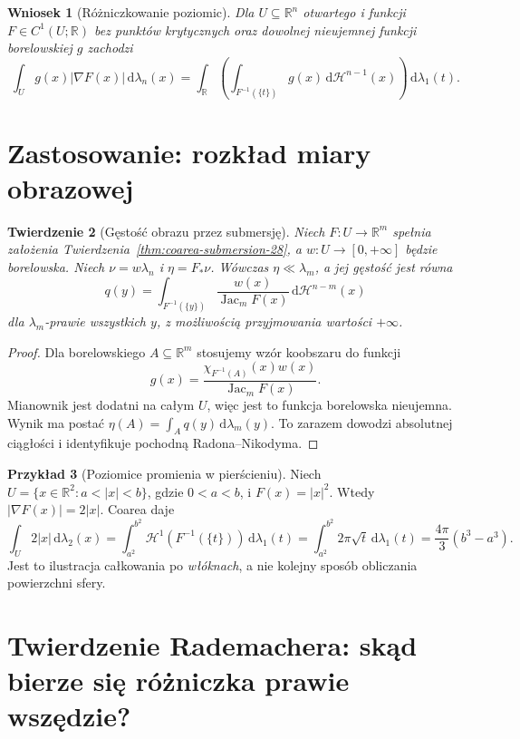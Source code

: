 \documentclass[11pt,a4paper,oneside]{book}
\numberwithin{equation}{chapter}
\theoremstyle{plain}
\newtheorem{twierdzenie}{Twierdzenie}[chapter]
\newtheorem{wniosek}[twierdzenie]{Wniosek}
\theoremstyle{definition}
\newtheorem{przyklad}[twierdzenie]{Przykład}
\theoremstyle{remark}
\begin{document}
\begin{wniosek}[Różniczkowanie poziomic]
\label{cor:coarea-level-28}
Dla $U\subseteq\mathbb R^n$ otwartego i
funkcji $F\in C^1(U;\mathbb R)$
bez punktów krytycznych oraz dowolnej
nieujemnej funkcji borelowskiej $g$ zachodzi
\[
 \int_U g(x)|\nabla F(x)|\,\mathrm d\lambda_n(x)
 =\int_{\mathbb R}\left(\int_{F^{-1}(\{t\})}
 g(x)\,\mathrm d\mathcal H^{n-1}(x)\right)
 \,\mathrm d\lambda_1(t).
\]
\end{wniosek}

\section{Zastosowanie: rozkład miary obrazowej}
\begin{twierdzenie}[Gęstość obrazu przez submersję]
\label{thm:pushforward-coarea-28}
Niech $F:U\to\mathbb R^m$ spełnia założenia
Twierdzenia~\ref{thm:coarea-submersion-28},
a $w:U\to[0,+\infty]$ będzie borelowska.
Niech $\nu=w\lambda_n$ i $\eta=F_*\nu$.
Wówczas $\eta\ll\lambda_m$, a jej gęstość jest
równa
\[
 q(y)=\int_{F^{-1}(\{y\})}
 \frac{w(x)}{\operatorname{Jac}_mF(x)}
 \,\mathrm d\mathcal H^{n-m}(x)
\]
dla $\lambda_m$-prawie wszystkich $y$,
z możliwością przyjmowania wartości $+\infty$.
\end{twierdzenie}
\begin{proof}
Dla borelowskiego $A\subseteq\mathbb R^m$
stosujemy wzór koobszaru do funkcji
\[
 g(x)=\frac{\chi_{F^{-1}(A)}(x)w(x)}
 {\operatorname{Jac}_mF(x)}.
\]
Mianownik jest dodatni na całym $U$, więc
jest to funkcja borelowska nieujemna.
Wynik ma postać
$\eta(A)=\int_A q(y)\,\mathrm d\lambda_m(y)$.
To zarazem dowodzi absolutnej ciągłości
i identyfikuje pochodną Radona--Nikodyma.
\end{proof}

\begin{przyklad}[Poziomice promienia w pierścieniu]
Niech $U=\{x\in\mathbb R^2:a<|x|<b\}$,
gdzie $0<a<b$, i $F(x)=|x|^2$.
Wtedy $|\nabla F(x)|=2|x|$. Coarea daje
\[
 \int_U 2|x|\,\mathrm d\lambda_2(x)
 =\int_{a^2}^{b^2}\mathcal H^1(F^{-1}(\{t\}))
 \,\mathrm d\lambda_1(t)
 =\int_{a^2}^{b^2}2\pi\sqrt t\,\mathrm d\lambda_1(t)
 =\frac{4\pi}{3}(b^3-a^3).
\]
Jest to ilustracja całkowania po \emph{włóknach},
a nie kolejny sposób obliczania powierzchni sfery.
\end{przyklad}


\section{Twierdzenie Rademachera: skąd bierze się różniczka prawie wszędzie?}
\label{sec:rademacher-28}
\end{document}
